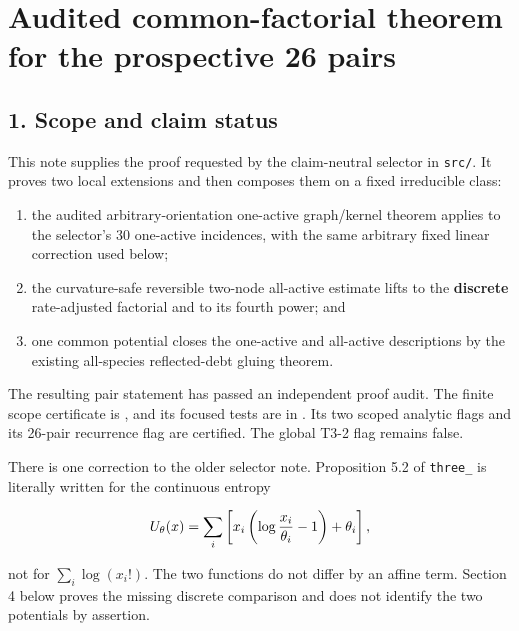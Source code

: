 \section{Audited common-factorial theorem for the prospective 26
pairs}

\subsection{1. Scope and claim status}

This note supplies the proof requested by the claim-neutral selector in
\texttt{src/\texttt{}}. It proves two local
extensions and then composes them on a fixed irreducible class:

\begin{enumerate}
\def\labelenumi{\arabic{enumi}.}
\tightlist
\item
  the audited arbitrary-orientation one-active graph/kernel theorem
  applies to the selector's 30 one-active incidences, with the same
  arbitrary fixed linear correction used below;
\item
  the curvature-safe reversible two-node all-active estimate lifts to
  the \textbf{discrete} rate-adjusted factorial and to its fourth power;
  and
\item
  one common potential closes the one-active and all-active descriptions
  by the existing all-species reflected-debt gluing theorem.
\end{enumerate}

The resulting pair statement has passed an independent proof audit. The
finite scope certificate is
\texttt{}, and its focused
tests are in
\texttt{}. Its two
scoped analytic flags and its 26-pair recurrence flag are certified. The
global T3-2 flag remains false.

There is one correction to the older selector note. Proposition 5.2 of
\texttt{three\_\texttt{}} is literally written for
the continuous entropy

\[
 U_\theta(x)=\sum_i\left[x_i\left(\log{x_i\over\theta_i}-1\right)
                         +\theta_i\right],
\]

not for \(\sum_i\log(x_i!)\). The two functions do not differ by an
affine term. Section 4 below proves the missing discrete comparison and
does not identify the two potentials by assertion.

